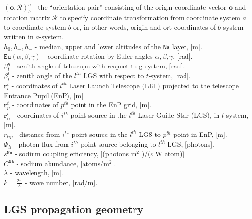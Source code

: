 $(\bm{o},\mathcal{R})_{b}^{a}$ - the ``orientation pair'' consisting of the
origin coordinate vector $\bm{o}$ and rotation matrix $\mathcal{R}$ to specify
coordinate transformation from coordinate system $a$ to coordinate system $b$
or, in other words, origin and ort coordinates of $b$-system written in
$a$-system.
\\

$h_{0},h_{+},h_{-}$ - median, upper and lower altitudes of the \texttt{Na}
layer, [m].
\\

$\texttt{Eu}(\alpha,\beta,\gamma)$ - coordinate rotation by Euler angles
$\alpha,\beta,\gamma$, [rad].
\\

$\beta_{t}^{g}$ - zenith angle of telescope with respect to g-system, [rad].
\\

$\beta_{l}^{t}$ - zenith angle of the $l^{th}$ LGS with respect to $t$-system,
[rad].
\\

$\bm{r}_{l}^{t}$ - coordinates of $l^{th}$ Laser Launch Telescope (LLT)
projected to the telescope Entrance Pupil (EnP), [m].
\\

$\bm{r}_{p}^{t}$ - coordinates of $p^{th}$ point in the EnP grid, [m].
\\

$\bm{r}_{li}^{l}$ - coordinates of $i^{th}$ point source in the $l^{th}$ Laser
Guide Star (LGS), in $l$-system, [m].
\\

$r_{lip}$ - distance from $i^{th}$ point source in the $l^{th}$ LGS to
$p^{th}$ point in EnP, [m].
\\

$\Phi_{li}$ - photon flux from $i^{th}$ point source belonging to $l^{th}$ LGS,
[photons].
\\

$s^{\texttt{Na}}$ - sodium coupling efficiency, [(photons m$^{2}$ )/(s W
atom)].
\\

$C^{\texttt{Na}}$ - sodium abundance, [atoms/m$^2$].
\\

$\lambda$ - wavelength, [m].
\\

$k = \frac{2 \pi}{\lambda}$ - wave number, [rad/m].

\subsection{LGS propagation geometry}
\label{sec:lgs-geometry}


